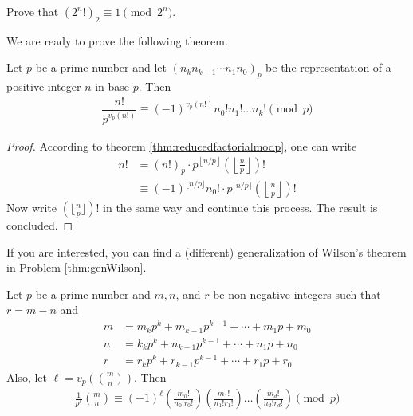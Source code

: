 \documentclass{subfile}
\begin{document}
	\begin{problem}
		Prove that $(2^n!)_2 \equiv 1 \pmod{2^n}$.
	\end{problem}

We are ready to prove the following theorem.

	\begin{theorem}\label{thm:wilsongeneral}
		Let $p$ be a prime number and let $(n_k n_{k-1}\cdots n_1 n_0)_p$ be the representation of a positive integer $n$ in base $p$. Then
			\begin{align}\label{eq:wilsongeneral}
				\dfrac{n!}{p^{v_p(n!)}}\equiv (-1)^{v_p(n!)} n_0!n_1!\dots n_k!\pmod p
			\end{align}
	\end{theorem}

	\begin{proof}
		According to theorem \eqref{thm:reducedfactorialmodp}, one can write
			\begin{align*}
				n!
					& = (n!)_p \cdot p^{\left\lfloor n/p\right\rfloor}\left(\left\lfloor\frac{n}{p}\right\rfloor\right)!\\
					& \equiv (-1)^{\lfloor n/p\rfloor} n_0! \cdot p^{\lfloor n/p \rfloor}\left(\left\lfloor\frac{n}{p}\right\rfloor\right)!
			\end{align*}
		Now write $(\lfloor \frac np\rfloor)!$ in the same way and continue this process. The result is concluded.
	\end{proof}

	\begin{note}
		If you are interested, you can find a (different) generalization of Wilson's theorem in Problem \ref{thm:genWilson}.
	\end{note}
	\begin{theorem}
		Let $p$ be a prime number and $m, n$, and $r$ be non-negative integers such that $r=m-n$ and
			\begin{align*}
				m&=m_kp^k+m_{k-1}p^{k-1}+\cdots +m_1p+m_0\\
				n&=k_kp^k+n_{k-1}p^{k-1}+\cdots +n_1p+n_0\\
				r&=r_kp^k+r_{k-1}p^{k-1}+\cdots +r_1p+r_0
			\end{align*}
		Also, let $\ell = v_p\left(\binom{m}{n}\right)$. Then
			\begin{align*}
				\frac1{p^\ell}\binom{m}{n}\equiv (-1)^\ell
				\left(\frac{m_0!}{n_0!r_0!}\right) \left(\frac{m_1!}{n_1!r_1!}\right) \dots \left(\frac{m_d!}{n_d!r_d!}\right) \pmod p
			\end{align*}
	\end{theorem}
\end{document}
